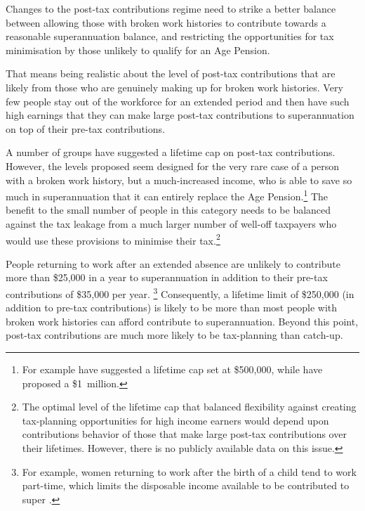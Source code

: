 Changes to the post-tax contributions regime need to strike a better balance between allowing those with broken work histories to contribute towards a reasonable superannuation balance, and restricting the opportunities for tax minimisation by those unlikely to qualify for an Age Pension.

That means being realistic about the level of post-tax contributions that are likely from those who are genuinely making up for broken work histories. Very few people stay out of the workforce for an extended period and then have such high earnings that they can make large post-tax contributions to superannuation on top of their pre-tax contributions. 

A number of groups have suggested a lifetime cap on post-tax contributions.  However, the levels proposed seem designed for the very rare case of a person with a broken work history, but a much-increased income, who is able to save so much in superannuation that it can entirely replace the Age Pension.\footnote{For example \textcite[][26]{RiceWarner2015SubmissionTaxWhitePaper} have suggested a lifetime cap set at \$500,000, while \textcite[][19]{ASFA2015TreasurySubmission} have proposed a \$1~million.} The benefit to the small number of people in this category needs to be balanced against the tax leakage from a much larger number of well-off taxpayers who would use these provisions to minimise their tax.\footnote{The optimal level of the lifetime cap that balanced flexibility against creating tax-planning opportunities for high income earners would depend upon contributions behavior of those that make large post-tax contributions over their lifetimes. However, there is no publicly available data on this issue.} 

People returning to work after an extended absence are unlikely to contribute more than \$25,000 in a year to superannuation in addition to their pre-tax contributions of \$35,000 per year.%
\footnote{For example, women returning to work after the birth of a child tend to work part-time, which limits the disposable income available to be contributed to super \textcite[][222]{ProductivityCommission2009PaidParentalLeave}.} %
Consequently, a lifetime limit of \$250,000 (in addition to pre-tax contributions) is likely to be more than most people with broken work histories can afford contribute to superannuation. Beyond this point, post-tax contributions are much more likely to be tax-planning than catch-up. 

